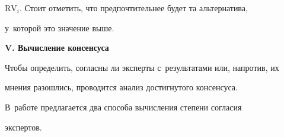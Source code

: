 $\mathrm{RV}_i$. Стоит отметить, что предпочтительнее будет та альтернатива, 


у~которой это значение выше.


  


  


  \textbf{V. Вычисление консенсуса}


  


  Чтобы определить, согласны ли эксперты с~результатами или, напротив, их 


мнения разошлись, проводится анализ достигнутого консенсуса.


  


  В~работе предлагается два способа вычисления степени согласия 


экспертов. 


